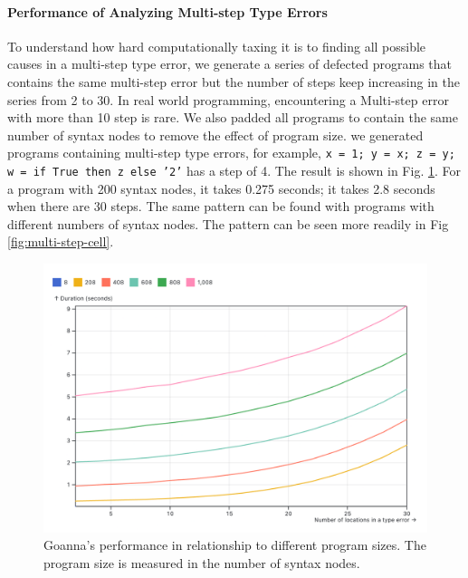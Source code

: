 \documentclass[pdflatex,sn-mathphys-num]{sn-jnl}%
\begin{document}

    
    \paragraph{\textbf{Performance of Analyzing Multi-step Type Errors}}
   To understand how hard computationally taxing it is to finding all possible causes in a multi-step type error, we generate a series of defected programs that contains the same multi-step error but the number of steps keep increasing in the series from 2 to 30. In real world programming, encountering a Multi-step error with more than 10 step is rare. We also padded all programs to contain the same number of syntax nodes to remove the effect of program size. we generated programs containing multi-step type errors, for example, \texttt{x = 1; y = x; z = y; w = if True then z else '2'} has a step of 4. The result is shown in Fig. \ref{fig:multi-step-time}. For a program with 200 syntax nodes, it takes 0.275 seconds;  it takes 2.8 seconds when there are 30 steps. The same pattern can be found with programs with different numbers of syntax nodes. The pattern can be seen more readily in Fig \ref{fig:multi-step-cell}.
    
 \begin{figure}[ht]
        \centering
        \includegraphics[width=0.8\linewidth]{images/multi-step.png}
        \caption{Goanna's performance in relationship to different program sizes. The program size is measured in the number of syntax nodes.}
        \label{fig:multi-step-time}
    \end{figure}
\end{document}
